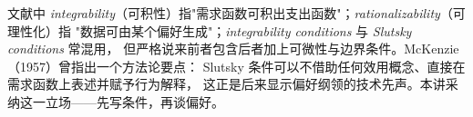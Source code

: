 \begin{remark}[术语小注]
文献中 \emph{integrability}（可积性）指"需求函数可积出支出函数"；\emph{rationalizability}（可理性化）指
"数据可由某个偏好生成"；\emph{integrability conditions} 与 \emph{Slutsky conditions} 常混用，
但严格说来前者包含后者加上可微性与边界条件。McKenzie（1957）曾指出一个方法论要点：
Slutsky 条件可以不借助任何效用概念、直接在需求函数上表述并赋予行为解释，
这正是后来显示偏好纲领的技术先声。本讲采纳这一立场——先写条件，再谈偏好。
\end{remark}
